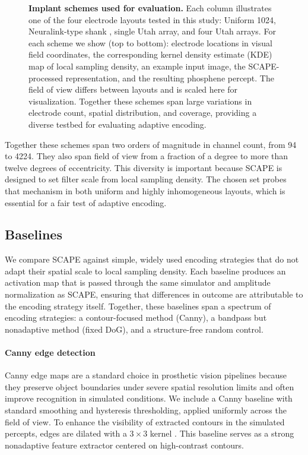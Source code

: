 \begin{figure}[ht!]
    \caption{\textbf{Implant schemes used for evaluation.} 
    Each column illustrates one of the four electrode layouts tested in this study: Uniform 1024, Neuralink-type shank \cite{Musk2019,Zhao2023}, single Utah array, and four Utah arrays. For each scheme we show (top to bottom): electrode locations in visual field coordinates, the corresponding kernel density estimate (KDE) map of local sampling density, an example input image, the SCAPE-processed representation, and the resulting phosphene percept. The field of view differs between layouts and is scaled here for visualization. Together these schemes span large variations in electrode count, spatial distribution, and coverage, providing a diverse testbed for evaluating adaptive encoding.}
    \label{fig:implant_schemes}
\end{figure}

\medskip
Together these schemes span two orders of magnitude in channel count, from 94 to 4224. They also span field of view from a fraction of a degree to more than twelve degrees of eccentricity. This diversity is important because SCAPE is designed to set filter scale from local sampling density. The chosen set probes that mechanism in both uniform and highly inhomogeneous layouts, which is essential for a fair test of adaptive encoding.


\subsection{Baselines}
We compare SCAPE against simple, widely used encoding strategies that do not adapt their spatial scale to local sampling density. Each baseline produces an activation map that is passed through the same simulator and amplitude normalization as SCAPE, ensuring that differences in outcome are attributable to the encoding strategy itself.  
Together, these baselines span a spectrum of encoding strategies: a contour-focused method (Canny), a bandpass but nonadaptive method (fixed DoG), and a structure-free random control.

\paragraph{Canny edge detection}
Canny edge maps are a standard choice in prosthetic vision pipelines because they preserve object boundaries under severe spatial resolution limits and often improve recognition in simulated conditions. We include a Canny baseline with standard smoothing and hysteresis thresholding, applied uniformly across the field of view. To enhance the visibility of extracted contours in the simulated percepts, edges are dilated with a $3 \times 3$ kernel \cite{deRuytervanSteveninck2020}. This baseline serves as a strong nonadaptive feature extractor centered on high-contrast contours.

